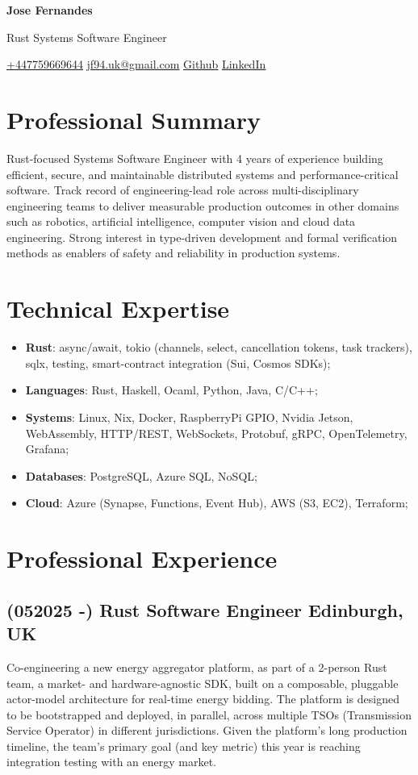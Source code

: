 ﻿\documentclass[11pt]{article}
\makeatletter
\newcommand{\MyName}{\color{headerGreen}Jose Fernandes}
\newcommand{\MyRole}{Rust Systems Software Engineer}
\newcommand{\MyNumber}{\LinkPhone{+447759669644}}
\newcommand{\MyEmail}{\LinkEmail{jf94.uk@gmail.com}}
\newcommand{\MyLinkedIn}{\LinkWeb{linkedin.com/in/xecarlox94/}{LinkedIn}}
\newcommand{\MyGithub}{\LinkWeb{github.com/xecarlox94}{Github}}
\newcommand{\LinkPhone}[1]{\href{tel:#1}{\underline{#1}}}
\newcommand{\LinkEmail}[1]{\href{mailto:#1}{\underline{#1}}}
\newcommand{\LinkWeb}[2]{\href{https://www.#1}{\underline{#2}}}
\newcommand{\UList}[1]{
\begin{itemize}[leftmargin=*]
  #1
\end{itemize}
}
\newcommand{\Title}{

  \begin{center}

    {\Huge\bfseries\MyName}

    \vspace{0.9em}

    {\Large\MyRole}

    \vspace{0.8em}

    \MyNumber \quad \quad
    \MyEmail \quad \quad
    \MyGithub \quad \quad
    \MyLinkedIn

  \end{center}
}
\newcommand{\sectionTitle}[1]{\section{\color{titleGreen}#1}}
\makeatother
\begin{document}
\Title

\sectionTitle{Professional Summary}

\indent Rust-focused Systems Software Engineer with 4 years of experience building efficient, secure, and maintainable distributed systems and performance-critical software. Track record of engineering-lead role across multi-disciplinary engineering teams to deliver measurable production outcomes in other domains such as robotics, artificial intelligence, computer vision and cloud data engineering. Strong interest in type-driven development and formal verification methods as enablers of safety and reliability in production systems.

\sectionTitle{Technical Expertise}

\UList{
  \item \textbf{Rust}: async/await, tokio (channels, select, cancellation tokens, task trackers), sqlx, testing, smart-contract integration (Sui, Cosmos SDKs);

  \item \textbf{Languages}: Rust, Haskell, Ocaml, Python, Java, C/C++;

  \item \textbf{Systems}: Linux, Nix, Docker, RaspberryPi GPIO, Nvidia Jetson, WebAssembly, HTTP/REST, WebSockets, Protobuf, gRPC, OpenTelemetry, Grafana;

  \item \textbf{Databases}: PostgreSQL, Azure SQL, NoSQL;

  \item \textbf{Cloud}: Azure (Synapse, Functions, Event Hub), AWS (S3, EC2), Terraform;
}



\sectionTitle{Professional Experience}

\subsection{(052025 -) Rust Software Engineer \hfill {}  \hfill Edinburgh, UK}

Co-engineering a new energy aggregator platform, as part of a 2-person Rust team, a market- and hardware-agnostic SDK, built on a composable, pluggable actor-model architecture for real-time energy bidding. The platform is designed to be bootstrapped and deployed, in parallel, across multiple TSOs (Transmission Service Operator) in different jurisdictions. Given the platform's long production timeline, the team's primary goal (and key metric) this year is reaching integration testing with an energy market.
\end{document}
